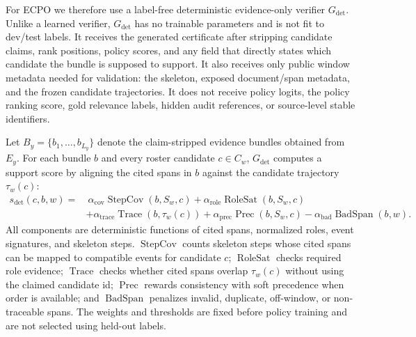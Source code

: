 \documentclass{article}
\newcommand{\Gdet}{G_{\mathrm{det}}}
\begin{document}
For ECPO we therefore use a label-free deterministic evidence-only verifier $\Gdet$. Unlike a learned verifier, $\Gdet$ has no trainable parameters and is not fit to dev/test labels. It receives the generated certificate after stripping candidate claims, rank positions, policy scores, and any field that directly states which candidate the bundle is supposed to support. It also receives only public window metadata needed for validation: the skeleton, exposed document/span metadata, and the frozen candidate trajectories. It does not receive policy logits, the policy ranking score, gold relevance labels, hidden audit references, or source-level stable identifiers.

Let $B_y=\{b_1,\ldots,b_{L_y}\}$ denote the claim-stripped evidence bundles obtained from $E_y$. For each bundle $b$ and every roster candidate $c\in C_w$, $\Gdet$ computes a support score by aligning the cited spans in $b$ against the candidate trajectory $\tau_w(c)$:
\begin{equation}
\begin{aligned}
s_{\mathrm{det}}(c,b,w)=&\ \alpha_{\mathrm{cov}}\operatorname{StepCov}(b,S_w,c)
+\alpha_{\mathrm{role}}\operatorname{RoleSat}(b,S_w,c)\\
&+\alpha_{\mathrm{trace}}\operatorname{Trace}(b,\tau_w(c))
+\alpha_{\mathrm{prec}}\operatorname{Prec}(b,S_w,c)
-\alpha_{\mathrm{bad}}\operatorname{BadSpan}(b,w).
\end{aligned}
\end{equation}
All components are deterministic functions of cited spans, normalized roles, event signatures, and skeleton steps. $\operatorname{StepCov}$ counts skeleton steps whose cited spans can be mapped to compatible events for candidate $c$; $\operatorname{RoleSat}$ checks required role evidence; $\operatorname{Trace}$ checks whether cited spans overlap $\tau_w(c)$ without using the claimed candidate id; $\operatorname{Prec}$ rewards consistency with soft precedence when order is available; and $\operatorname{BadSpan}$ penalizes invalid, duplicate, off-window, or non-traceable spans. The weights and thresholds are fixed before policy training and are not selected using held-out labels.
\end{document}

